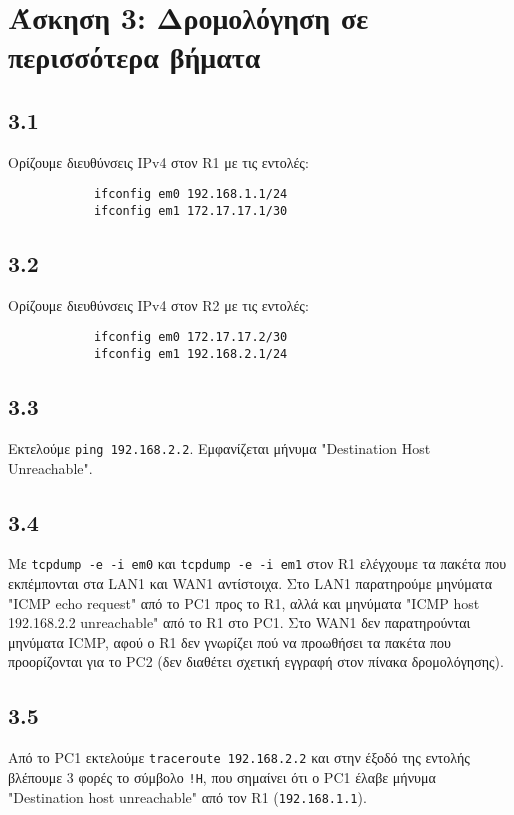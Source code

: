 \documentclass[a4paper, 12pt]{article}
\begin{document}
\section*{Άσκηση 3: Δρομολόγηση σε περισσότερα βήματα}

	\subsection*{3.1}
		Ορίζουμε διευθύνσεις IPv4 στον R1 με τις εντολές:
		
		\begin{verbatim}
			ifconfig em0 192.168.1.1/24
			ifconfig em1 172.17.17.1/30
		\end{verbatim}	

	\subsection*{3.2}
		Ορίζουμε διευθύνσεις IPv4 στον R2 με τις εντολές:
		
		\begin{verbatim}
			ifconfig em0 172.17.17.2/30
			ifconfig em1 192.168.2.1/24
		\end{verbatim}

	\subsection*{3.3}
		Εκτελούμε \verb|ping 192.168.2.2|. Εμφανίζεται μήνυμα "Destination Host Unreachable".

	\subsection*{3.4}
		Με \verb|tcpdump -e -i em0| και \verb|tcpdump -e -i em1| στον R1 ελέγχουμε τα πακέτα που εκπέμπονται στα LAN1 και WAN1 αντίστοιχα. Στο LAN1 παρατηρούμε μηνύματα "ICMP echo request" από το PC1 προς το R1, αλλά και μηνύματα "ICMP host 192.168.2.2 unreachable" από το R1 στο PC1. Στο WAN1 δεν παρατηρούνται μηνύματα ICMP, αφού ο R1 δεν γνωρίζει πού να προωθήσει τα πακέτα που προορίζονται για το PC2 (δεν διαθέτει σχετική εγγραφή στον πίνακα δρομολόγησης). 

	\subsection*{3.5}
		Από το PC1 εκτελούμε \verb|traceroute 192.168.2.2| και στην έξοδό της εντολής βλέπουμε 3 φορές το σύμβολο \verb|!H|, που σημαίνει ότι ο PC1 έλαβε μήνυμα "Destination host unreachable" από τον R1 (\verb|192.168.1.1|).
\end{document}
